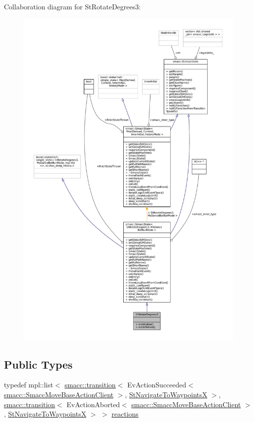 Collaboration diagram for St\+Rotate\+Degrees3\+:
\nopagebreak
\begin{figure}[H]
\begin{center}
\leavevmode
\includegraphics[width=350pt]{structStRotateDegrees3__coll__graph}
\end{center}
\end{figure}
\subsection*{Public Types}
\begin{DoxyCompactItemize}
\item 
typedef mpl\+::list$<$ \hyperlink{classsmacc_1_1transition}{smacc\+::transition}$<$ Ev\+Action\+Succeeded$<$ \hyperlink{classsmacc_1_1SmaccMoveBaseActionClient}{smacc\+::\+Smacc\+Move\+Base\+Action\+Client} $>$, \hyperlink{structStNavigateToWaypointsX}{St\+Navigate\+To\+WaypointsX} $>$, \hyperlink{classsmacc_1_1transition}{smacc\+::transition}$<$ Ev\+Action\+Aborted$<$ \hyperlink{classsmacc_1_1SmaccMoveBaseActionClient}{smacc\+::\+Smacc\+Move\+Base\+Action\+Client} $>$, \hyperlink{structStNavigateToWaypointsX}{St\+Navigate\+To\+WaypointsX} $>$ $>$ \hyperlink{structStRotateDegrees3_ae2fa4cf769a28bbc126e3e8734dac27d}{reactions}
\end{DoxyCompactItemize}
